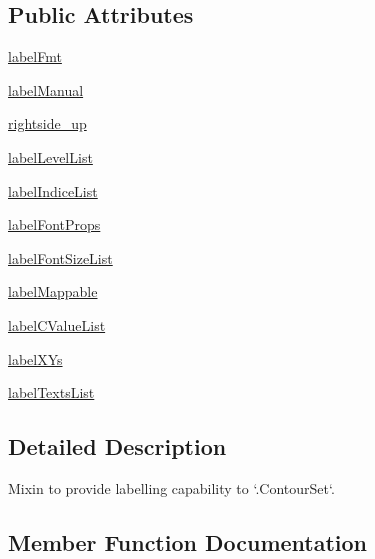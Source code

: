 \subsection*{Public Attributes}
\begin{DoxyCompactItemize}
\item 
\hyperlink{classmatplotlib_1_1contour_1_1ContourLabeler_afa345adec79411feef47d3ac254d5237}{label\+Fmt}
\item 
\hyperlink{classmatplotlib_1_1contour_1_1ContourLabeler_a773177dd7ca969108529bb355efb29ed}{label\+Manual}
\item 
\hyperlink{classmatplotlib_1_1contour_1_1ContourLabeler_a6483793952df92f50ddb5c0fa115db45}{rightside\+\_\+up}
\item 
\hyperlink{classmatplotlib_1_1contour_1_1ContourLabeler_a1590db053c80b916d12ca78930022ecd}{label\+Level\+List}
\item 
\hyperlink{classmatplotlib_1_1contour_1_1ContourLabeler_ac163a41925b5b6c638e546d84b205262}{label\+Indice\+List}
\item 
\hyperlink{classmatplotlib_1_1contour_1_1ContourLabeler_ab850ccdcb055eeedb871396165969a65}{label\+Font\+Props}
\item 
\hyperlink{classmatplotlib_1_1contour_1_1ContourLabeler_a789e00335697b157880ebb28b4d61324}{label\+Font\+Size\+List}
\item 
\hyperlink{classmatplotlib_1_1contour_1_1ContourLabeler_ac0d706cb4f95135c9c48513217db44c0}{label\+Mappable}
\item 
\hyperlink{classmatplotlib_1_1contour_1_1ContourLabeler_a6ef63c0945b4d875a4aacc0332e68957}{label\+C\+Value\+List}
\item 
\hyperlink{classmatplotlib_1_1contour_1_1ContourLabeler_ad20709e44e4ff0ad7e74509ac5d7796c}{label\+X\+Ys}
\item 
\hyperlink{classmatplotlib_1_1contour_1_1ContourLabeler_ae2e057c8640f8c9b79001c6a155a496d}{label\+Texts\+List}
\end{DoxyCompactItemize}


\subsection{Detailed Description}
\begin{DoxyVerb}Mixin to provide labelling capability to `.ContourSet`.\end{DoxyVerb}
 

\subsection{Member Function Documentation}
\mbox{\label{classmatplotlib_1_1contour_1_1ContourLabeler_a58dbf28d7f287d2f99d39e1305a379f1}} 
